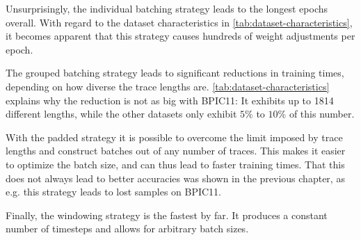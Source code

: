 Unsurprisingly, the individual batching strategy leads to the longest epochs overall. With regard to the dataset characteristics in \autoref{tab:dataset-characteristics}, it becomes apparent that this strategy causes hundreds of weight adjustments per epoch.

The grouped batching strategy leads to significant reductions in training times, depending on how diverse the trace lengths are. \autoref{tab:dataset-characteristics} explains why the reduction is not as big with BPIC11: It exhibits up to 1814 different lengths, while the other datasets only exhibit $5\%$ to $10\%$ of this number.

With the padded strategy it is possible to overcome the limit imposed by trace lengths and construct batches out of any number of traces. This makes it easier to optimize the batch size, and can thus lead to faster training times. That this does not always lead to better accuracies was shown in the previous chapter, as e.g. this strategy leads to lost samples on BPIC11.

Finally, the windowing strategy is the fastest by far. It produces a constant number of timesteps and allows for arbitrary batch sizes.

